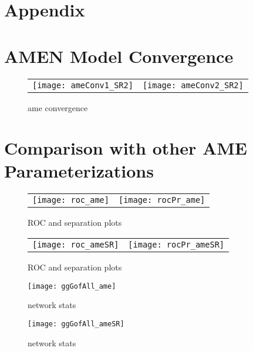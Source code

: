 \newpage
\section{Appendix}

\section{AMEN Model Convergence}

\begin{figure}[ht]
	\centering
	\begin{tabular}{cc}
	\texttt{[image: ameConv1\_SR2]} &
	\texttt{[image: ameConv2\_SR2]}
	\end{tabular}
	\caption{ame convergence}
	\label{fig:ameConv}
\end{figure}


\section{Comparison with other AME Parameterizations}







\begin{figure}[ht]
	\centering
	\begin{tabular}{cc}
	\texttt{[image: roc\_ame]} & 
	\texttt{[image: rocPr\_ame]}
	\end{tabular}
	\caption{ROC and separation plots}
	\label{fig:roc_latentSpace}
\end{figure}



\begin{figure}[ht]
	\centering
	\begin{tabular}{cc}
	\texttt{[image: roc\_ameSR]} & 
	\texttt{[image: rocPr\_ameSR]}
	\end{tabular}
	\caption{ROC and separation plots}
	\label{fig:roc_latentSpace}
\end{figure}

\begin{figure}[ht]
	\centering
	\texttt{[image: ggGofAll\_ame]}
	\caption{network stats }
	\label{fig:gofAll_ame}
\end{figure}

\begin{figure}[ht]
	\centering
	\texttt{[image: ggGofAll\_ameSR]}
	\caption{network stats }
	\label{fig:gofAll_ameSR}
\end{figure}

